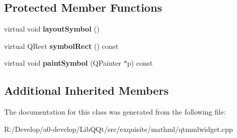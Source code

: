 \subsection*{Protected Member Functions}
\begin{DoxyCompactItemize}
\item 
\mbox{\label{class_mml_mtable_node_ab7f777167cb11b96a926fc0e414c3617}} 
virtual void {\bfseries layout\+Symbol} ()
\item 
\mbox{\label{class_mml_mtable_node_a4d698e059af5503ab643d9fec1d7a2dd}} 
virtual Q\+Rect {\bfseries symbol\+Rect} () const
\item 
\mbox{\label{class_mml_mtable_node_a36090ce71eb085d939ae30c4423b7add}} 
virtual void {\bfseries paint\+Symbol} (Q\+Painter $\ast$p) const
\end{DoxyCompactItemize}
\subsection*{Additional Inherited Members}


The documentation for this class was generated from the following file\+:\begin{DoxyCompactItemize}
\item 
R\+:/\+Develop/a0-\/develop/\+Lib\+Q\+Qt/src/exquisite/mathml/qtmmlwidget.\+cpp\end{DoxyCompactItemize}
